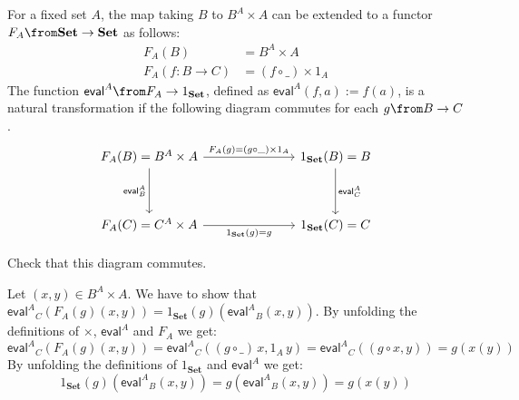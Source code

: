 \newcommand{\eval}[1]{\ensuremath{\mathsf{eval}^{#1}\xspace}}

\begin{exercise}
  For a fixed set $A$, the map taking $B$ to $B^A \times A$ can be extended to
  a functor $F_A\from \mathbf{Set} \to \mathbf{Set}$ as follows:
  \begin{align*}
    F_A(B) & =  B^A \times A\\
    F_A(f: B \to C) & =  (f \circ \_) \times 1_A
  \end{align*}
  The function $\eval{A} \from F_A \to 1_{\mathbf{Set}}$, defined as $\eval{A}(f,a) := f(a)$, is a natural transformation if the following diagram commutes for each $g \from B \to C$.
\[
  \begin{tikzcd}
    F_A(B) = B^A \times A \arrow{rrr}{F_A(g)=(g\circ \_) \times 1_A} \arrow{dd}[swap]{\eval{A}_B} & & & 1_{\mathbf{Set}}(B) = B \arrow{dd}{\eval{A}_C} \\
                                                                                           & & & \\
    F_A(C) = C^A \times A \arrow{rrr}[swap]{1_{\mathbf{Set}}(g) = g} & & & 1_{\mathbf{Set}}(C) = C
  \end{tikzcd}
\]

Check that this diagram commutes.
\end{exercise}
\begin{answer}
  Let $(x,y) \in B^A \times A$. We have to show that $\eval{A}_C (F_A(g) (x,y)) = 1_{\mathbf {Set}}(g) (\eval{A}_B (x, y))$.
  By unfolding the definitions of $\times$, $\eval{A}$ and $F_A$ we get:
  \[
    \eval{A}_C (F_A(g) (x,y)) =
    \eval{A}_C ((g \circ \_)\,x, 1_A\,y) =
    \eval{A}_C ((g \circ x, y)) =
    g (x (y))
    \]
  By unfolding the definitions of $1_{\mathbf {Set}}$ and $\eval{A}$ we get:
  \[
    1_{\mathbf {Set}}(g) (\eval{A}_B (x, y)) =
    g (\eval{A}_B (x, y)) =
    g (x (y))
    \]
\end{answer}

